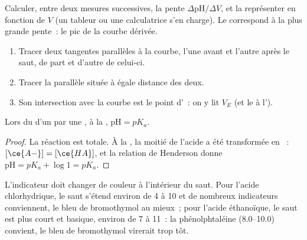 \begin{method}\label{met:g12:ph-conductivity-titrations:derivative}
Calculer, entre deux mesures successives, la pente
$\Delta\mathrm{pH}/\Delta V$, et la représenter en fonction de $V$ (un
tableur ou une calculatrice s'en charge). Le 
correspond à la plus grande pente~: le pic de la courbe dérivée.
\end{method}

\begin{method}\label{met:g12:ph-conductivity-titrations:tangent}
\begin{enumerate}
  \item Tracer deux tangentes parallèles à la courbe, l'une avant et
        l'autre après le saut, de part et d'autre de celui-ci.
  \item Tracer la parallèle située à égale distance des deux.
  \item Son intersection avec la courbe est le point d'~: on
        y lit $V_E$ (et le  à l').
\end{enumerate}
\end{method}

\begin{proposition}[À la demi-équivalence, $\mathrm{pH} = pK_a$]\label{prop:g12:ph-conductivity-titrations:half}
Lors du  d'un   par une , à la
, $\mathrm{pH} = pK_a$.
\end{proposition}

\begin{proof}
La réaction  est totale. À la ,
la moitié
de l'acide a été transformée en ~: $[\ce{A-}] = [\ce{HA}]$, et
la relation de Henderson donne $\mathrm{pH} = pK_a + \log 1 = pK_a$.
\end{proof}

\begin{remark}\label{rem:g12:ph-conductivity-titrations:indicator}
L'indicateur doit changer de couleur à l'intérieur du saut. Pour l'acide
chlorhydrique, le saut s'étend environ de  4 à 10 et de nombreux
indicateurs conviennent, le bleu de bromothymol au mieux~; pour l'acide
éthanoïque, le saut est plus court et basique, environ de 7 à 11~: la
phénolphtaléine (8.0--10.0) convient, le bleu de bromothymol virerait
trop tôt.
\end{remark}

